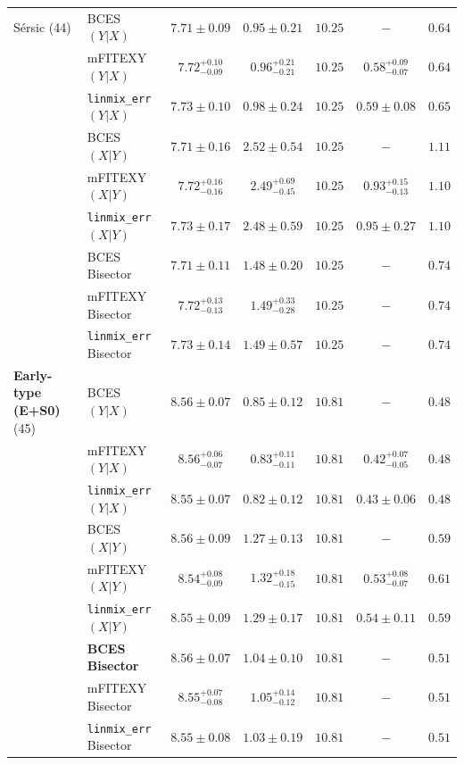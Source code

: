 \documentclass[preprint2]{emulateapj}
\begin{document}
\begin{table}
\begin{tabular}{llccccc}
 S\'ersic (44)		& BCES $(Y|X)$      & $7.71 \pm 0.09$ & $0.95 \pm 0.21$ & $10.25$ & $-$ & $0.64$ \\
 			& mFITEXY $(Y|X)$   & $7.72^{+0.10}_{-0.09}$ & $0.96^{+0.21}_{-0.21}$ & $10.25$ & $0.58^{+0.09}_{-0.07}$ & $0.64$ \\
 			& {\tt linmix\_err} $(Y|X)$     & $7.73 \pm 0.10$ & $0.98 \pm 0.24$ & $10.25$ & $0.59 \pm 0.08$ & $0.65$ \\ [0.5em]
 			& BCES $(X|Y)$      & $7.71 \pm 0.16$ & $2.52 \pm 0.54$ & $10.25$ & $-$ & $1.11$ \\
 			& mFITEXY $(X|Y)$   & $7.72^{+0.16}_{-0.16}$ & $2.49^{+0.69}_{-0.45}$ & $10.25$ & $0.93^{+0.15}_{-0.13}$ & $1.10$ \\
 			& {\tt linmix\_err} $(X|Y)$     & $7.73 \pm 0.17$ & $2.48 \pm 0.59$ & $10.25$ & $0.95 \pm 0.27$ & $1.10$ \\ [0.5em]
 			& BCES Bisector     & $7.71 \pm 0.11$ & $1.48 \pm 0.20$ & $10.25$ & $-$ & $0.74$ \\
 			& mFITEXY Bisector  & $7.72^{+0.13}_{-0.13}$ & $1.49^{+0.33}_{-0.28}$ & $10.25$ & $-$    & $0.74$ \\
 			& {\tt linmix\_err} Bisector	& $7.73 \pm 0.14$ & $1.49 \pm 0.57$ & $10.25$ & $-$	& $0.74$ \\ [0.5em]

{\bf Early-type (E+S0)} (45)  & BCES $(Y|X)$       & $8.56 \pm 0.07$ & $0.85 \pm 0.12$ & $10.81$ & $-$ & $0.48$ \\
                              & mFITEXY $(Y|X)$     & $8.56^{+0.06}_{-0.07}$ & $0.83^{+0.11}_{-0.11}$ & $10.81$ & $0.42^{+0.07}_{-0.05}$ & $0.48$ \\
                              & {\tt linmix\_err} $(Y|X)$     & $8.55 \pm 0.07$ & $0.82 \pm 0.12$ & $10.81$ & $0.43 \pm 0.06$ & $0.48$ \\ [0.5em]
                              & BCES $(X|Y)$       & $8.56 \pm 0.09$ & $1.27 \pm 0.13$ & $10.81$ & $-$ & $0.59$ \\
                              & mFITEXY $(X|Y)$     & $8.54^{+0.08}_{-0.09}$ & $1.32^{+0.18}_{-0.15}$ & $10.81$ & $0.53^{+0.08}_{-0.07}$ & $0.61$ \\
                              & {\tt linmix\_err} $(X|Y)$     & $8.55 \pm 0.09$ & $1.29 \pm 0.17$ & $10.81$ & $0.54 \pm 0.11$ & $0.59$ \\ [0.5em]
                              & {\bf BCES Bisector}& $\boldsymbol{8.56 \pm 0.07}$ & $\boldsymbol{1.04 \pm 0.10}$ & $\boldsymbol{10.81}$ & $-$ & $\boldsymbol{0.51}$ \\
                              & mFITEXY Bisector    & $8.55^{+0.07}_{-0.08}$ & $1.05^{+0.14}_{-0.12}$ & $10.81$ & $-$                    & $0.51$ \\
                              & {\tt linmix\_err} Bisector    & $8.55 \pm 0.08$ & $1.03 \pm 0.19$ & $10.81$ & $-$    & $0.51$ \\ [0.5em]


\end{tabular}
\end{table}
\end{document}
